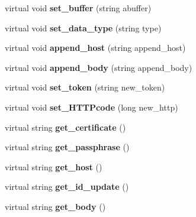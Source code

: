 \begin{DoxyCompactItemize}
\item 
virtual void {\bfseries set\+\_\+buffer} (string abuffer)\hypertarget{classRed_a6f665171ff116be053fa2a6c28dbcce3}{}\label{classRed_a6f665171ff116be053fa2a6c28dbcce3}

\item 
virtual void {\bfseries set\+\_\+data\+\_\+type} (string type)\hypertarget{classRed_aa9cd4d799ee2bf80e82621cb84970f5f}{}\label{classRed_aa9cd4d799ee2bf80e82621cb84970f5f}

\item 
virtual void {\bfseries append\+\_\+host} (string append\+\_\+host)\hypertarget{classRed_a8cb485c605fa95abcca829ea3c061535}{}\label{classRed_a8cb485c605fa95abcca829ea3c061535}

\item 
virtual void {\bfseries append\+\_\+body} (string append\+\_\+body)\hypertarget{classRed_aa45f3662e6913c464e63b28647563582}{}\label{classRed_aa45f3662e6913c464e63b28647563582}

\item 
virtual void {\bfseries set\+\_\+token} (string new\+\_\+token)\hypertarget{classRed_aec37fdde55fc2c9f094451277fa2b2f0}{}\label{classRed_aec37fdde55fc2c9f094451277fa2b2f0}

\item 
virtual void {\bfseries set\+\_\+\+H\+T\+T\+Pcode} (long new\+\_\+http)\hypertarget{classRed_a178b9e5ecd8ebcd2a0bf07c7e9f19ebc}{}\label{classRed_a178b9e5ecd8ebcd2a0bf07c7e9f19ebc}

\item 
virtual string {\bfseries get\+\_\+certificate} ()\hypertarget{classRed_af4609e83bebea999da177f5582494205}{}\label{classRed_af4609e83bebea999da177f5582494205}

\item 
virtual string {\bfseries get\+\_\+passphrase} ()\hypertarget{classRed_af7a444f1bc49b57c062989ce26d1f93e}{}\label{classRed_af7a444f1bc49b57c062989ce26d1f93e}

\item 
virtual string {\bfseries get\+\_\+host} ()\hypertarget{classRed_a329822e14d5e16c50ab04d95df669d3d}{}\label{classRed_a329822e14d5e16c50ab04d95df669d3d}

\item 
virtual string {\bfseries get\+\_\+id\+\_\+update} ()\hypertarget{classRed_aae848ad1d9b7b7b9a022a19c01e9ca8c}{}\label{classRed_aae848ad1d9b7b7b9a022a19c01e9ca8c}

\item 
virtual string {\bfseries get\+\_\+body} ()\hypertarget{classRed_a34b8624c32c7106d8ae85ba06eddf8fe}{}\label{classRed_a34b8624c32c7106d8ae85ba06eddf8fe}


\end{DoxyCompactItemize}
